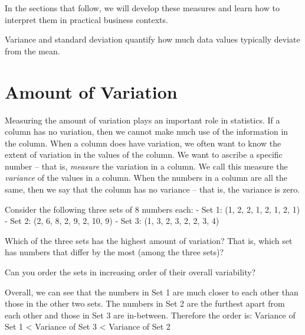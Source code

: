 \documentclass[
  12pt,
  letterpaper,
  DIV=11,
  numbers=noendperiod]{scrreprt}
\begin{document}
In the sections that follow, we will develop these measures and learn
how to interpret them in practical business contexts.

\begin{tcolorbox}[enhanced jigsaw, colback=white, leftrule=.75mm, toprule=.15mm, bottomtitle=1mm, breakable, coltitle=black, toptitle=1mm, title=\textcolor{quarto-callout-important-color}{\faExclamation}\hspace{0.5em}{Grasp this}, opacitybacktitle=0.6, colbacktitle=quarto-callout-important-color!10!white, arc=.35mm, left=2mm, colframe=quarto-callout-important-color-frame, titlerule=0mm, rightrule=.15mm, bottomrule=.15mm, opacityback=0]

Variance and standard deviation quantify how much data values typically
deviate from the mean.

\end{tcolorbox}

\section{Amount of Variation}\label{amount-of-variation}

Measuring the amount of variation plays an important role in statistics.
If a column has no variation, then we cannot make much use of the
information in the column. When a column does have variation, we often
want to know the extent of variation in the values of the column. We
want to ascribe a specific number -- that is, \emph{measure} the
variation in a column. We call this measure the \emph{variance} of the
values in a column. When the numbers in a column are all the same, then
we say that the column has no variance -- that is, the variance is zero.

Consider the following three sets of 8 numbers each: - Set 1: (1, 2, 2,
1, 2, 1, 2, 1) - Set 2: (2, 6, 8, 2, 9, 2, 10, 9) - Set 3: (1, 3, 2, 3,
2, 2, 3, 4)

Which of the three sets has the highest amount of variation? That is,
which set has numbers that differ by the most (among the three sets)?

Can you order the sets in increasing order of their overall variability?

Overall, we can see that the numbers in Set 1 are much closer to each
other than those in the other two sets. The numbers in Set 2 are the
furthest apart from each other and those in Set 3 are in-between.
Therefore the order is: \newline\newline Variance of Set 1 \textless{}
Variance of Set 3 \textless{} Variance of Set 2
\end{document}
